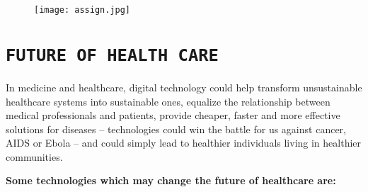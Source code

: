 \documentclass[12pt]{article}
\begin{document}
\vspace{0.5cm}

\begin{figure}[h]
\centering
\texttt{[image: assign.jpg]}
\end{figure}

\pagebreak


\section{\LARGE\centering\texttt{FUTURE OF HEALTH CARE}}

In medicine and healthcare, digital technology could help transform unsustainable healthcare systems into sustainable ones, equalize the relationship between medical professionals and patients, provide cheaper, faster and more effective solutions for diseases – technologies could win the battle for us against cancer, AIDS or Ebola – and could simply lead to healthier individuals living in healthier communities.\\


\vspace{0.5cm}

\textbf{Some technologies which may change the future of healthcare are:}
\end{document}
